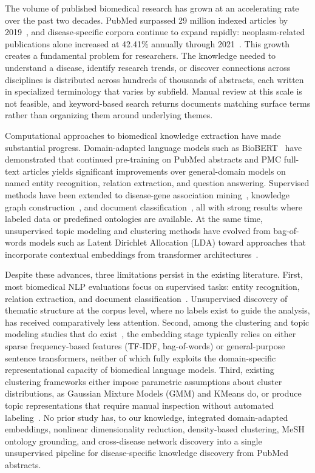 \documentclass[a4paper,fleqn]{cas-dc}
\begin{document}
The volume of published biomedical research has grown at an accelerating rate over the past two decades. PubMed surpassed 29 million indexed articles by 2019~\cite{ref1}, and disease-specific corpora continue to expand rapidly: neoplasm-related publications alone increased at 42.41\% annually through 2021~\cite{ref13}. This growth creates a fundamental problem for researchers. The knowledge needed to understand a disease, identify research trends, or discover connections across disciplines is distributed across hundreds of thousands of abstracts, each written in specialized terminology that varies by subfield. Manual review at this scale is not feasible, and keyword-based search returns documents matching surface terms rather than organizing them around underlying themes.

Computational approaches to biomedical knowledge extraction have made substantial progress. Domain-adapted language models such as BioBERT~\cite{ref1} have demonstrated that continued pre-training on PubMed abstracts and PMC full-text articles yields significant improvements over general-domain models on named entity recognition, relation extraction, and question answering. Supervised methods have been extended to disease-gene association mining~\cite{ref8,ref10}, knowledge graph construction~\cite{ref9}, and document classification~\cite{ref13}, all with strong results where labeled data or predefined ontologies are available. At the same time, unsupervised topic modeling and clustering methods have evolved from bag-of-words models such as Latent Dirichlet Allocation (LDA) toward approaches that incorporate contextual embeddings from transformer architectures~\cite{ref15,ref17}.

Despite these advances, three limitations persist in the existing literature. First, most biomedical NLP evaluations focus on supervised tasks: entity recognition, relation extraction, and document classification~\cite{ref2,ref3,ref4,ref5,ref6}. Unsupervised discovery of thematic structure at the corpus level, where no labels exist to guide the analysis, has received comparatively less attention. Second, among the clustering and topic modeling studies that do exist~\cite{ref15,ref16,ref17}, the embedding stage typically relies on either sparse frequency-based features (TF-IDF, bag-of-words) or general-purpose sentence transformers, neither of which fully exploits the domain-specific representational capacity of biomedical language models. Third, existing clustering frameworks either impose parametric assumptions about cluster distributions, as Gaussian Mixture Models (GMM) and KMeans do, or produce topic representations that require manual inspection without automated labeling~\cite{ref17}. No prior study has, to our knowledge, integrated domain-adapted embeddings, nonlinear dimensionality reduction, density-based clustering, MeSH ontology grounding, and cross-disease network discovery into a single unsupervised pipeline for disease-specific knowledge discovery from PubMed abstracts.
\end{document}
